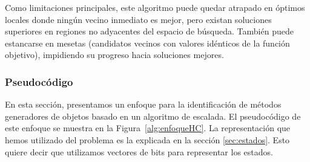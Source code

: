 Como limitaciones principales, este algoritmo puede quedar atrapado en óptimos locales donde ningún vecino inmediato es mejor, 
pero existan soluciones superiores en regiones no adyacentes del espacio de búsqueda. 
También puede estancarse en mesetas (candidatos vecinos con valores idénticos de la función objetivo), 
impidiendo su progreso hacia soluciones mejores.





\subsubsection{Pseudocódigo}

En esta sección, presentamos un enfoque para la identificación de métodos generadores de objetos basado en un algoritmo de escalada. El pseudocódigo de este enfoque se muestra en la Figura~\ref{alg:enfoqueHC}.
La representación que hemos utilizado del problema es la explicada en la sección \ref{sec:estados}. Esto quiere decir que utilizamos vectores de bits para representar los estados. 



